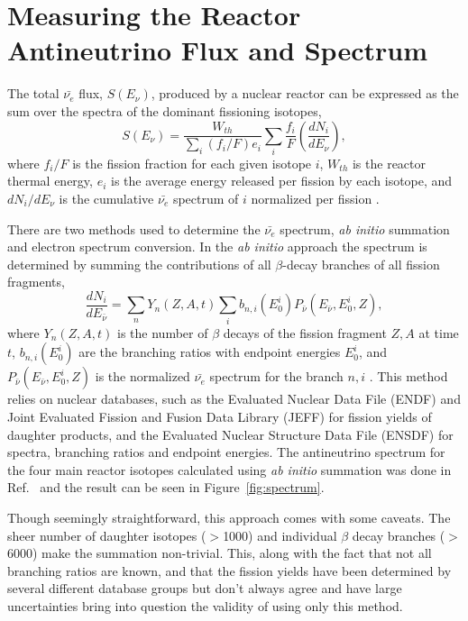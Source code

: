 \section{Measuring the Reactor Antineutrino Flux and Spectrum}

The total $\bar{\nu_{e}}$ flux, $S(E_\nu)$, produced by a nuclear reactor can be expressed as the sum over the spectra of the dominant fissioning isotopes,
\begin{equation}
	S(E_\nu) = \frac{W_{th}}{\sum_{i}(f_i/F)e_i}\sum_{i}\frac{f_i}{F}\left(\frac{dN_i}{dE_\nu}\right) ,
\end{equation}
where $f_i/F$ is the fission fraction for each given isotope $i$, $W_{th}$ is the reactor thermal energy, $e_i$ is the 
average energy released per fission by each isotope, and $dN_i/dE_\nu$ is the cumulative $\bar{\nu_e}$ spectrum of $i$ normalized per fission \cite{HayesVogel}.

There are two methods used to determine the $\bar{\nu_e}$ spectrum, \textit{ab initio} summation and electron spectrum conversion.
In the \textit{ab initio} approach the spectrum is determined by summing the contributions of all $\beta$-decay branches of all fission fragments,
\begin{equation}
	\frac{dN_i}{dE_{\bar{\nu}}} =  \sum_{n}Y_n(Z,A,t)\sum_{i}b_{n,i}(E^i_0)P_{\bar{\nu}}(E_{\bar{\nu}},E^i_0,Z) ,
\end{equation}
where $Y_n(Z,A,t)$ is the number of $\beta$ decays of the fission fragment $Z, A$ at time $t$, $b_{n,i}(E^i_0)$ are the branching ratios with endpoint energies $E^i_0$, and $P_{\bar{\nu}}(E_{\bar{\nu}},E^i_0,Z)$ is the normalized $\bar{\nu_e}$ spectrum for the branch $n, i$ \cite{HayesVogel}.
This method relies on nuclear databases, such as the Evaluated Nuclear Data File (ENDF) \cite{ENDF} and Joint Evaluated Fission and Fusion Data Library (JEFF) \cite{JEFF} for fission yields of daughter products, and the Evaluated Nuclear Structure Data File (ENSDF) \cite{ENSDF} for spectra, branching ratios and endpoint energies.
The antineutrino spectrum for the four main reactor isotopes calculated using \textit{ab initio} summation was done in Ref.~\cite{HayesVogel} and the result can be seen in Figure~\ref{fig:spectrum}. 

Though seemingly straightforward, this approach comes with some caveats.
The sheer number of daughter isotopes ($>$1000) and individual $\beta$ decay branches ($>$6000) make the summation non-trivial.
This, along with the fact that not all branching ratios are known, and that the fission yields have been determined by several different database groups but don't always agree and have large uncertainties bring into question the validity of using only this method. 


